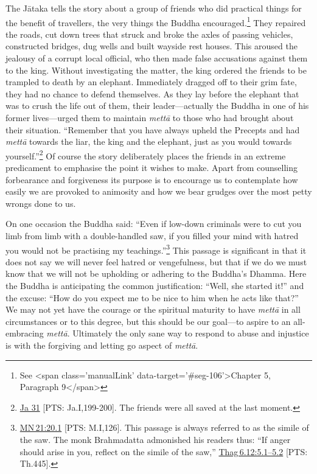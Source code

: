 \documentclass[10pt, openright]{book}
\begin{document}
The Jātaka tells the story about a group of friends who did practical things for the benefit of travellers, the very things the Buddha encouraged.\footnote {See <span class='manualLink' data-target='#seg-106'>Chapter 5, Paragraph 9</span>} They repaired the roads, cut down trees that struck and broke the axles of passing vehicles, constructed bridges, dug wells and built wayside rest houses. This aroused the jealousy of a corrupt local official, who then made false accusations against them to the king. Without investigating the matter, the king ordered the friends to be trampled to death by an elephant. Immediately dragged off to their grim fate, they had no chance to defend themselves. As they lay before the elephant that was to crush the life out of them, their leader—actually the Buddha in one of his former lives—urged them to maintain \textit{mettā} to those who had brought about their situation. “Remember that you have always upheld the Precepts and had \textit{mettā} towards the liar, the king and the elephant, just as you would towards yourself.”\footnote {\href{https://suttacentral.net/ja31/en/chalmers?reference=main/pts#pts-vp-pli199}{Ja 31} [PTS: Ja.I,199-200]. The friends were all saved at the last moment.} Of course the story deliberately places the friends in an extreme predicament to emphasise the point it wishes to make. Apart from counselling forbearance and forgiveness its purpose is to encourage us to contemplate how easily we are provoked to animosity and how we bear grudges over the most petty wrongs done to us.


On one occasion the Buddha said: “Even if low-down criminals were to cut you limb from limb with a double-handled saw, if you filled your mind with hatred you would not be practising my teachings.”\footnote {\href{https://suttacentral.net/mn21/en/sujato\#20.1}{MN 21:20.1} [PTS: M.I,126]. This passage is always referred to as the simile of the saw. The monk Brahmadatta admonished his readers thus: “If anger should arise in you, reflect on the simile of the saw,” \href{https://suttacentral.net/thag6.12/en/sujato\#5.1}{Thag 6.12:5.1–5.2} [PTS: Th.445].} This passage is significant in that it does not say we will never feel hatred or vengefulness, but that if we do we must know that we will not be upholding or adhering to the Buddha’s Dhamma. Here the Buddha is anticipating the common justification: “Well, she started it!” and the excuse: “How do you expect me to be nice to him when he acts like that?” We may not yet have the courage or the spiritual maturity to have \textit{mettā} in all circumstances or to this degree, but this should be our goal—to aspire to an all-embracing \textit{mettā}. Ultimately the only sane way to respond to abuse and injustice is with the forgiving and letting go aspect of \textit{mettā}.
\end{document}
